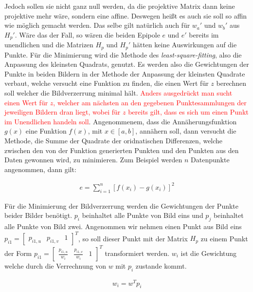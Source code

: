 Jedoch sollen sie nicht ganz null werden, da die projektive Matrix dann keine projektive mehr wäre, sondern eine affine.  Deswegen heißt es auch sie soll so affin wie möglich gemacht werden. Das selbe gilt natürlich auch für $w_a'$ und $w_b'$ aus $H_p'$. Wäre das der Fall, so wären die beiden Epipole $e$ und $e'$ bereits im unendlichen und die Matrizen $H_p$ und $H_p'$ hätten keine Auswirkungen auf die Punkte. Für die Minimierung wird die Methode des \textit{least-square-fitting}, also die Anpassung des kleinsten Quadrats, genutzt\cite{leastSquare}. Es werden also die Gewichtungen der Punkte in beiden Bildern in der Methode der Anpassung der kleinsten Quadrate verbaut, welche versucht eine Funktion zu finden, die einen Wert für $z$ berechnen soll welcher die Bildverzerrung minimal hält. \textcolor{red}{Anders ausgedrückt man sucht einen Wert für $z$, welcher am nächsten an den gegebenen Punktesammlungen der jeweiligen Bildern dran liegt, wobei für $z$ bereits gilt, dass es sich um einen Punkt im Unendlichen handeln soll}\cite{ZZ,leastSquare}. Angenommenem, dass die Annäherungsfunktion $g(x)$ eine Funktion $f(x)$, mit $x \in [a,b]$, annähern soll, dann versucht die Methode, die Summe der Quadrate der oridnatischen Differenzen, welche zwischen den von der Funktion generierten Punkten und den Punkten aus den Daten gewonnen wird, zu minimieren\cite{leastSquare,Margulies.}. Zum Beispiel werden $n$ Datenpunkte angenommen, dann gilt:

\begin{gather}
	e = \sum_{i=1}^{n}[f(x_i)-g(x_i)]^2
\end{gather}

Für die Minimierung der Bildverzerrung werden die Gewichtungen der Punkte beider Bilder benötigt. $p_i$ beinhaltet alle Punkte von Bild eins und $p_j$ beinhaltet alle Punkte von Bild zwei. Angenommen wir nehmen einen Punkt aus Bild eins $p_{i1} = \begin{bmatrix}p_{i1,u}&p_{i1,v}&1\end{bmatrix}^T$, so soll dieser Punkt mit der Matrix $H_p$ zu einem Punkt der Form  $p_{i1} = \begin{bmatrix}\frac{p_{i1,u}}{w_i}&\frac{p_{i1,v}}{w_i}&1\end{bmatrix}^T$ transformiert werden. $w_i$ ist die Gewichtung welche durch die Verrechnung von $w$ mit $p_i$ zustande kommt.

\begin{gather}
	w_i=w^Tp_i
\end{gather} 

